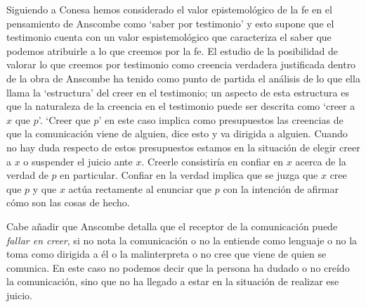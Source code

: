 Siguiendo a Conesa hemos considerado el valor epistemológico de la fe en el pensamiento de Anscombe como `saber por testimonio' y esto supone que el testimonio cuenta con un valor espistemológico que caracteriza el saber que podemos atribuirle a lo que creemos por la fe. El estudio de la posibilidad de valorar lo que creemos por testimonio como creencia verdadera justificada dentro de la obra de Anscombe ha tenido como punto de partida el análisis de lo que ella llama la `estructura' del creer en el testimonio; un aspecto de esta estructura es que la naturaleza de la creencia en el testimonio puede ser descrita como `creer a $x$ que $p$'. `Creer que $p$' en este caso implica como presupuestos las creencias de que la comunicación viene de alguien, dice esto y va dirigida a alguien. Cuando no hay duda respecto de estos presupuestos estamos en la situación de elegir creer a $x$ o suspender el juicio ante $x$. Creerle consistiría en confiar en $x$ acerca de la verdad de $p$ en particular. Confiar en la verdad implica que se juzga que $x$ cree que $p$ y que $x$ actúa rectamente al enunciar que $p$ con la intención de afirmar cómo son las cosas de hecho.

Cabe añadir que Anscombe detalla que el receptor de la comunicación puede \emph{fallar en creer}, si no nota la comunicación o no la entiende como lenguaje o no la toma como dirigida a él o la malinterpreta o no cree que viene de quien se comunica. En este caso no podemos decir que la persona ha dudado o no creído la comunicación, sino que no ha llegado a estar en la situación de realizar ese juicio.

